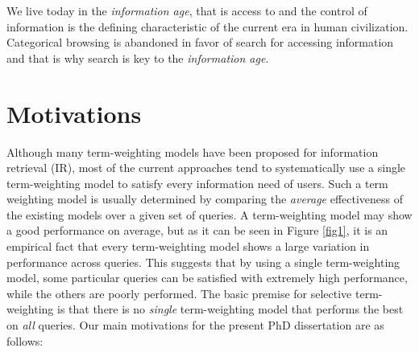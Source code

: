 We live today in the \emph{information age}, that is access to and the control of information is the defining characteristic of the current era in human civilization.
Categorical browsing is abandoned in favor of search for accessing information and that is why search is key to the \emph{information age}.

\section{Motivations}
\label{1.1}

Although many term-weighting models have been proposed for information retrieval (IR), most of the current approaches tend to systematically use a single term-weighting model to satisfy every information need of users.
Such a term weighting model is usually determined by comparing the \emph{average} effectiveness of the existing models over a given set of queries.
A term-weighting model may show a good performance on average, but as it can be seen in Figure \ref{fig1}, it is an empirical fact that every term-weighting model shows a large variation in performance across queries. 
This suggests that by using a single term-weighting model, some particular queries can be satisfied with extremely high performance, while the others are poorly performed.
The basic premise for selective term-weighting is that there is no \emph{single} term-weighting model that performs the best on \emph{all} queries.
Our main motivations for the present PhD dissertation are as follows: 

